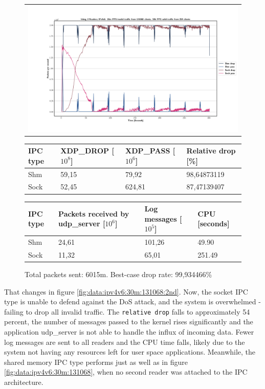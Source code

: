 \begin{figure}[!h]
	\centering
	\scriptsize
	\begin{tabular}{c}
    	\centerline{\includegraphics[width=1.2\textwidth]{images/IPv4v6_20m_2ndReader_1.png}}
	\end{tabular}
	\begin{tabular}{llll}
		\toprule
		\textbf{IPC type} & \textbf{XDP\_DROP [$10^8$]} & \textbf{XDP\_PASS [$10^6$]} & \textbf{Relative drop [\%]} \\ \midrule 
		Shm & 59,15 & 79,92 & 98,64873119 \\
        Sock & 52,45 & 624,81 & 87,47139407 \\
	\bottomrule
	\end{tabular}
    \begin{tabular}{llll}
		\toprule
		\textbf{IPC type} & \textbf{Packets received by udp\_server [$10^6$]} & \textbf{Log messages [$10^5$]} & \textbf{CPU [seconds]} \\ \midrule 
		Shm & 24,61 & 101,26 & 49.90 \\
        Sock & 11,32 & 65,01 & 251.49 \\
	\bottomrule
	\end{tabular}
	\caption[Simplefail2ban with 2nd Reader, IPv4v6, 20m \ac{PPS}, 131068 malicious clients]{Total packets sent: 6015m. Best-case drop rate: 99,934466\%}
	\label{fig:data:ipv4v6:20m:131068:2nd}
\end{figure}

That changes in figure \ref{fig:data:ipv4v6:30m:131068:2nd}.
Now, the socket \ac{IPC} type is unable to defend against the \ac{DoS} attack, and the system is overwhelmed - failing to drop all invalid traffic.  
The \texttt{relative drop} falls to approximately 54 percent, the number of messages passed to the kernel rises significantly and the application udp\_server is not able to handle the influx of incoming data.
Fewer log messages are sent to all readers and the \ac{CPU} time falls, likely due to the system not having any resources left for user space applications.
Meanwhile, the shared memory \ac{IPC} type performs just as well as in figure \ref{fig:data:ipv4v6:30m:131068}, when no second reader was attached to the \ac{IPC} architecture.

